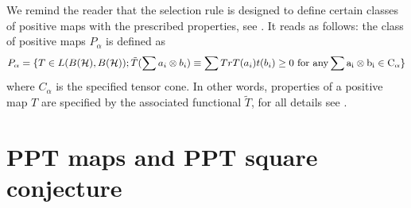 \documentclass{amsart}
\theoremstyle{plain}
\theoremstyle{definition}
\newcommand{\cH}{\mathcal{H}}
\begin{document}
We remind the reader that the selection rule is designed to define certain classes of positive maps with the prescribed properties, see  \cite{Maj}. It reads as follows: the class of positive maps  $P_{\alpha}$ is defined as
\begin{equation}
\label{SR}
P_{\alpha} = \{ T \in L(B(\cH), B(\cH)); \tilde{T}(\sum a_i \otimes b_i) \equiv \sum  Tr T(a_i) t(b_i) \geq 0 \ \rm{for \ any} \sum a_i \otimes b_i \in C_{\alpha} \}
\end{equation}
where $C_{\alpha}$ is the specified tensor cone. In other words, properties of a positive map $T$ are specified by the associated functional $\tilde{T}$, for all details see \cite{Maj}.

\section{PPT maps and PPT square conjecture}
\end{document}
